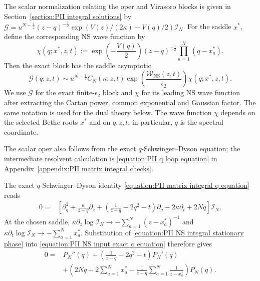 \documentclass[a4paper,11pt]{article}
\numberwithin{equation}{section}
\begin{document}
The scalar normalization relating the oper and Virasoro blocks is
given in Section~\ref{section:PII integral solutions} by
$\mathcal{G}=u^{N-\frac{1}{2}}(z-q)^{-\frac{1}{2}}
\exp\left({V(z)}/{(2\kappa)}-{V(q)}/{2}\right)\mathcal{I}_{N}$.
For the saddle $x^{*}$, define the corresponding NS wave function by
\begin{equation}
	\label{equation:PII NS scalar wavefunction}
	\chi(q;x^{*},z,t):=
	\exp\left(-\frac{V(q)}{2}\right)
	(z-q)^{-\frac{1}{2}}
	\prod_{a=1}^{N}(q-x_{a}^{*}).
\end{equation}
Then the exact block has the saddle asymptotic
\begin{equation}
	\mathcal{G}(q;z,t)
	\sim u^{N-\frac{1}{2}}C_{N}(\kappa;z,t)
	\exp\left(\frac{\mathcal{W}_{\mathrm{NS}}(z,t)}{\epsilon_{2}}\right)
	\chi(q;x^{*},z,t).
\end{equation}
We use $\mathcal{G}$ for the exact finite-$\epsilon_{2}$ block and
$\chi$ for its leading NS wave function after extracting the
Cartan power, common exponential and Gaussian factor.  The same
notation is used for the dual theory below.  The wave function $\chi$ depends on the selected
Bethe roots $x^{*}$ and on $q,z,t$; in particular, $q$ is the spectral
coordinate.

The scalar oper also follows from the exact $q$-Schwinger--Dyson
equation; the intermediate resolvent calculation is
\eqref{equation:PII q loop equation} in
Appendix~\ref{appendix:PII matrix integral checks}.

The exact $q$-Schwinger--Dyson identity
\eqref{equation:PII matrix integral q equation} reads
\begin{equation}
	\label{equation:PII NS input exact q equation}
	\begin{aligned}
		0={}&\left[\partial_{q}^{2}
		+\frac{\kappa}{z-q}\partial_{z}
		+\left(\frac{1}{z-q}-2q^{2}-t\right)\partial_{q}
		-2\kappa\partial_{t}+2Nq\right]\mathcal{I}_{N}.
	\end{aligned}
\end{equation}
At the chosen saddle,
$\kappa\partial_{z}\log\mathcal{I}_{N}\to
-\sum_{a=1}^{N}(z-x_{a}^{*})^{-1}$ and
$\kappa\partial_{t}\log\mathcal{I}_{N}\to
-\sum_{a=1}^{N}x_{a}^{*}$.
Substitution of \eqref{equation:PII NS integral stationary phase} into
\eqref{equation:PII NS input exact q equation} therefore gives
\begin{equation}
	\label{equation:PII NS polynomial ODE}
	\begin{aligned}
		0={}&P_{N}''(q)
		+\left(\frac{1}{z-q}-2q^{2}-t\right)P_{N}'(q)\\
		&+\left(2Nq+2\sum_{a=1}^{N}x_{a}^{*}
		-\frac{1}{z-q}\sum_{a=1}^{N}\frac{1}{z-x_{a}^{*}}\right)P_{N}(q).
	\end{aligned}
\end{equation}
\end{document}
